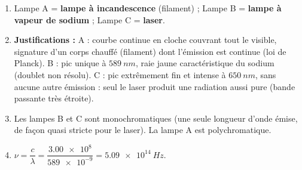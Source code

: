 \documentclass[11pt]{article}
\newcommand{\cle}[1]{{\popxbold\color{popdark}#1}}
\begin{document}
\begin{corrige}
\begin{enumerate}
\item Lampe A = \textbf{lampe à incandescence} (filament) ; Lampe B = \textbf{lampe à vapeur de sodium} ; Lampe C = \textbf{laser}.
\item \textbf{Justifications :} A : courbe continue en cloche couvrant tout le visible, signature d'un \cle{corps chauffé} (filament) dont l'émission est continue (loi de Planck). B : pic unique à $\SI{589}{nm}$, \cle{raie jaune} caractéristique du sodium (doublet non résolu). C : pic extrêmement fin et intense à $\SI{650}{nm}$, sans aucune autre émission : seul le laser produit une radiation aussi \cle{pure} (bande passante très étroite).
\item Les lampes B et C sont \cle{monochromatiques} (une seule longueur d'onde émise, de façon quasi stricte pour le laser). La lampe A est \cle{polychromatique}.
\item $\nu = \dfrac{c}{\lambda} = \dfrac{\num{3,00e8}}{\num{589e-9}} = \SI{5,09e14}{Hz}$.
\end{enumerate}
\end{corrige}
\end{document}
